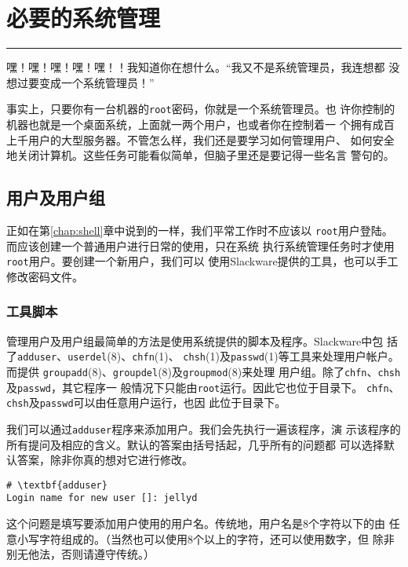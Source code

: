 
\chapter{必要的系统管理}
\label{chap:systemAdministration}

\rule{\textwidth}{0.1pt}
嘿！嘿！嘿！嘿！嘿！！我知道你在想什么。``我又不是系统管理员，我连想都
没想过要变成一个系统管理员！''

事实上，只要你有一台机器的\texttt{root}密码，你就是一个系统管理员。也
许你控制的机器也就是一个桌面系统，上面就一两个用户，也或者你在控制着一
个拥有成百上千用户的大型服务器。不管怎么样，我们还是要学习如何管理用户、
如何安全地关闭计算机。这些任务可能看似简单，但脑子里还是要记得一些名言
警句的。

\section{用户及用户组}
\label{sec:systemAdministration:usersAndGroups}
正如在第\ref{chap:shell}章中说到的一样，我们平常工作时不应该以
\texttt{root}用户登陆。而应该创建一个普通用户进行日常的使用，只在系统
执行系统管理任务时才使用\texttt{root}用户。要创建一个新用户，我们可以
使用Slackware提供的工具，也可以手工修改密码文件。

\subsection{工具脚本}
\label{sec:systemAdministration:usersAndGroups:suppliedScripts}
管理用户及用户组最简单的方法是使用系统提供的脚本及程序。Slackware中包
括了\texttt{adduser}、\texttt{userdel}(8)、\texttt{chfn}(1)、
\texttt{chsh}(1)及\texttt{passwd}(1)等工具来处理用户帐户。而提供
\texttt{groupadd}(8)、\texttt{groupdel}(8)及\texttt{groupmod}(8)来处理
用户组。除了\texttt{chfn}、\texttt{chsh}及\texttt{passwd}，其它程序一
般情况下只能由\texttt{root}运行。因此它也位于目录下。
\texttt{chfn}、\texttt{chsh}及\texttt{passwd}可以由任意用户运行，也因
此位于目录下。

我们可以通过\texttt{adduser}程序来添加用户。我们会先执行一遍该程序，演
示该程序的所有提问及相应的含义。默认的答案由括号括起，几乎所有的问题都
可以选择默认答案，除非你真的想对它进行修改。

\begin{Verbatim}[frame=single, commandchars=\\\{\}]
# \textbf{adduser}
Login name for new user []: jellyd
\end{Verbatim}
这个问题是填写要添加用户使用的用户名。传统地，用户名是8个字符以下的由
任意小写字符组成的。（当然也可以使用8个以上的字符，还可以使用数字，但
除非别无他法，否则请遵守传统。）

